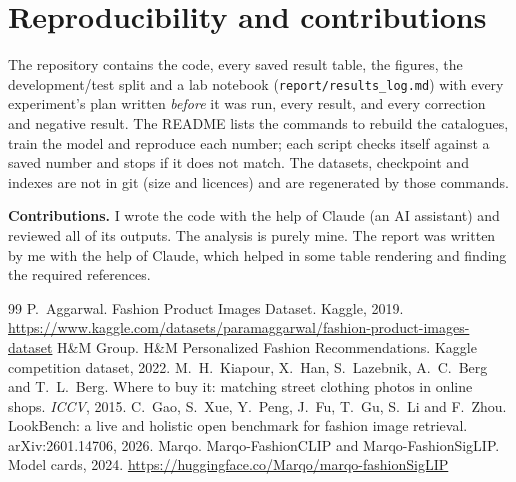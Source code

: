\documentclass[11pt,a4paper]{article}
\begin{document}
\section{Reproducibility and contributions}

The repository contains the code, every saved result table, the figures, the development/test split and a
lab notebook (\texttt{report/results\_log.md}) with every experiment's plan written \emph{before} it was run,
every result, and every correction and negative result. The README lists the commands to rebuild the
catalogues, train the model and reproduce each number; each script checks itself against a saved number and
stops if it does not match. The datasets, checkpoint and indexes are not in git (size and licences) and are
regenerated by those commands.

\textbf{Contributions.} I wrote the code with the help of Claude (an AI assistant) and reviewed all of its
outputs. The analysis is purely mine. The report was written by me with the help of Claude, which helped in some table rendering and finding the required references.

\begin{thebibliography}{99}\small
{} P.~Aggarwal. Fashion Product Images Dataset. Kaggle, 2019.
  \url{https://www.kaggle.com/datasets/paramaggarwal/fashion-product-images-dataset}
 H\&M Group. H\&M Personalized Fashion Recommendations. Kaggle competition dataset, 2022.
 M.~H.~Kiapour, X.~Han, S.~Lazebnik, A.~C.~Berg and T.~L.~Berg. Where to buy it:
  matching street clothing photos in online shops. \emph{ICCV}, 2015.
 C.~Gao, S.~Xue, Y.~Peng, J.~Fu, T.~Gu, S.~Li and F.~Zhou. LookBench: a live and holistic
  open benchmark for fashion image retrieval. arXiv:2601.14706, 2026.
 Marqo. Marqo-FashionCLIP and Marqo-FashionSigLIP. Model cards, 2024.
  \url{https://huggingface.co/Marqo/marqo-fashionSigLIP}
\end{thebibliography}
\end{document}
